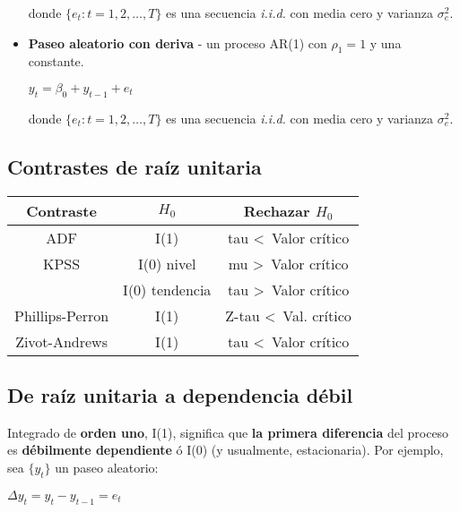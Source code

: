 \documentclass[10pt, a4paper, landscape]{article}
\begin{document}
\begin{multicols}{3}
\begin{itemize}[leftmargin=*]
			donde $\lbrace e_{t} : t = 1, 2, \ldots, T \rbrace$ es una secuencia \textsl{i.i.d.} con media cero y varianza $\sigma^{2}_{e}$.
			
			\item \textbf{Paseo aleatorio con deriva} - un proceso AR(1) con $\rho_{1} = 1$ y una constante.
			
			\begin{center}
				$y_{t} = \beta_{0} + y_{t - 1} + e_{t}$
			\end{center}
			
			donde $\lbrace e_{t} : t = 1, 2, \ldots, T \rbrace$ es una secuencia \textsl{i.i.d.} con media cero y varianza $\sigma^{2}_{e}$.
		\end{itemize}
		
		\subsection*{Contrastes de raíz unitaria}
		
		\begin{center}
			\begin{tabular}{ c | c | c }
				Contraste       & $H_{0}$        & Rechazar $H_{0}$                  \\ \hline
				ADF             & I(1)           & tau \textless \, Valor crítico    \\ \hline
				KPSS            & I(0) nivel     & mu \textgreater \, Valor crítico  \\
				                & I(0) tendencia & tau \textgreater \, Valor crítico \\ \hline
				Phillips-Perron & I(1)           & Z-tau \textless \, Val. crítico   \\ \hline
				Zivot-Andrews   & I(1)           & tau \textless \, Valor crítico
			\end{tabular}
		\end{center}
		
		\subsection*{De raíz unitaria a dependencia débil}
		
		Integrado de \textbf{orden uno}, I(1), significa que \textbf{la primera diferencia} del proceso es \textbf{débilmente dependiente} ó I(0) (y usualmente, estacionaria). Por ejemplo, sea $\lbrace y_{t} \rbrace$ un paseo aleatorio:
		
		\begin{multicols}{2}
			\begin{center}
				$\Delta y_{t} = y_{t} - y_{t - 1} = e_{t}$
			\end{center}
			

\end{multicols}
\end{multicols}
\end{document}
